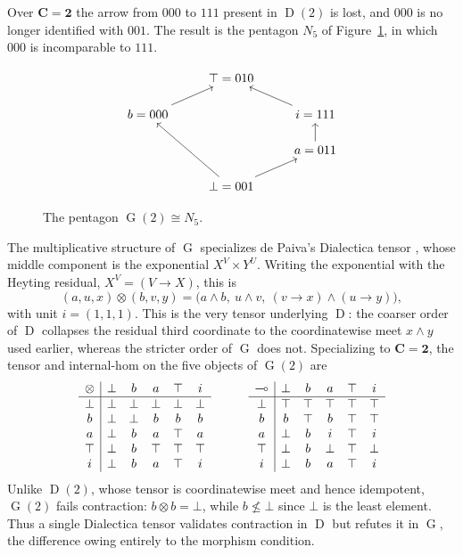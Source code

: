 \documentclass[reqno]{amsart}
\theoremstyle{plain}
\theoremstyle{definition}
\DeclareMathOperator{\D}{D}
\DeclareMathOperator{\G}{G}
\newcommand{\cf}[1]{\mathbf{#1}}
\begin{document}
Over $\cf{C} = \mathbf{2}$ the arrow from $000$ to $111$ present in $\D(2)$ is lost, and $000$ is no longer identified with $001$. The result is the pentagon $N_5$ of Figure~\ref{fig: G(2)}, in which $000$ is incomparable to $111$.
\begin{figure}[h]
$$
\begin{tikzcd}[row sep = 15]
 & \top = 010 &  \\
b = 000 \ar{ur} &  & i = 111 \ar{ul}   \\
 &  & a = 011 \ar{u} \\
 &  \bot = 001 \ar{uul} \ar{ur} &
\end{tikzcd}
$$
\caption{The pentagon $\G(2) \cong N_5$.}\label{fig: G(2)}
\end{figure}

The multiplicative structure of $\G$ specializes de Paiva's Dialectica tensor \cite{dePaiva1991}, whose middle component is the exponential $X^V \times Y^U$. Writing the exponential with the Heyting residual, $X^V = (V \rightarrow X)$, this is
\begin{equation*}
    (a,u,x) \otimes (b,v,y) = \bigl( a \wedge b,\ u \wedge v,\ (v \rightarrow x) \wedge (u \rightarrow y) \bigr),
\end{equation*}
with unit $i = (1,1,1)$. This is the very tensor underlying $\D$: the coarser order of $\D$ collapses the residual third coordinate to the coordinatewise meet $x \wedge y$ used earlier, whereas the stricter order of $\G$ does not. Specializing to $\cf{C} = \mathbf{2}$, the tensor and internal-hom on the five objects of $\G(2)$ are
\begin{equation*}
\begin{array}{c | c c c c c}
\otimes & \bot & b & a & \top & i \\
\hline
\bot & \bot & \bot & \bot & \bot & \bot \\
b & \bot & \bot & b & b & b \\
a & \bot & b & a & \top & a \\
\top & \bot & b & \top & \top & \top \\
i & \bot & b & a & \top & i
\end{array}
\hskip 3 em
\begin{array}{c | c c c c c}
\multimap & \bot & b & a & \top & i \\
\hline
\bot & \top & \top & \top & \top & \top \\
b & b & \top & b & \top & \top \\
a & \bot & b & i & \top & i \\
\top & \bot & b & \bot & \top & \bot \\
i & \bot & b & a & \top & i
\end{array}
\end{equation*}
Unlike $\D(2)$, whose tensor is coordinatewise meet and hence idempotent, $\G(2)$ fails contraction: $b \otimes b = \bot$, while $b \nleq \bot$ since $\bot$ is the least element. Thus a single Dialectica tensor validates contraction in $\D$ but refutes it in $\G$, the difference owing entirely to the morphism condition.
\end{document}
